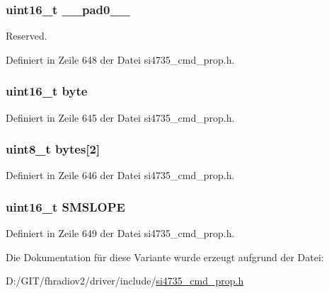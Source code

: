 \subsubsection[{\+\_\+\+\_\+pad0\+\_\+\+\_\+}]{\setlength{\rightskip}{0pt plus 5cm}uint16\+\_\+t \+\_\+\+\_\+pad0\+\_\+\+\_\+}\label{unionfm__soft__mute__slope_a77132c2c26a75f5b8751b235cda23828}


Reserved. 



Definiert in Zeile 648 der Datei si4735\+\_\+cmd\+\_\+prop.\+h.

\hypertarget{unionfm__soft__mute__slope_ab0549c1b5ea980a02e7eab77e21fea49}{}
\subsubsection[{byte}]{\setlength{\rightskip}{0pt plus 5cm}uint16\+\_\+t byte}\label{unionfm__soft__mute__slope_ab0549c1b5ea980a02e7eab77e21fea49}


Definiert in Zeile 645 der Datei si4735\+\_\+cmd\+\_\+prop.\+h.

\hypertarget{unionfm__soft__mute__slope_a46e4c05d20a047ec169f60d3167e912e}{}
\subsubsection[{bytes}]{\setlength{\rightskip}{0pt plus 5cm}uint8\+\_\+t bytes\mbox{[}2\mbox{]}}\label{unionfm__soft__mute__slope_a46e4c05d20a047ec169f60d3167e912e}


Definiert in Zeile 646 der Datei si4735\+\_\+cmd\+\_\+prop.\+h.

\hypertarget{unionfm__soft__mute__slope_a8a31c13b7632cb2f54277566150f231c}{}
\subsubsection[{S\+M\+S\+L\+O\+P\+E}]{\setlength{\rightskip}{0pt plus 5cm}uint16\+\_\+t S\+M\+S\+L\+O\+P\+E}\label{unionfm__soft__mute__slope_a8a31c13b7632cb2f54277566150f231c}


Definiert in Zeile 649 der Datei si4735\+\_\+cmd\+\_\+prop.\+h.



Die Dokumentation für diese Variante wurde erzeugt aufgrund der Datei\+:\begin{DoxyCompactItemize}
\item 
D\+:/\+G\+I\+T/fhradiov2/driver/include/\hyperlink{si4735__cmd__prop_8h}{si4735\+\_\+cmd\+\_\+prop.\+h}\end{DoxyCompactItemize}
